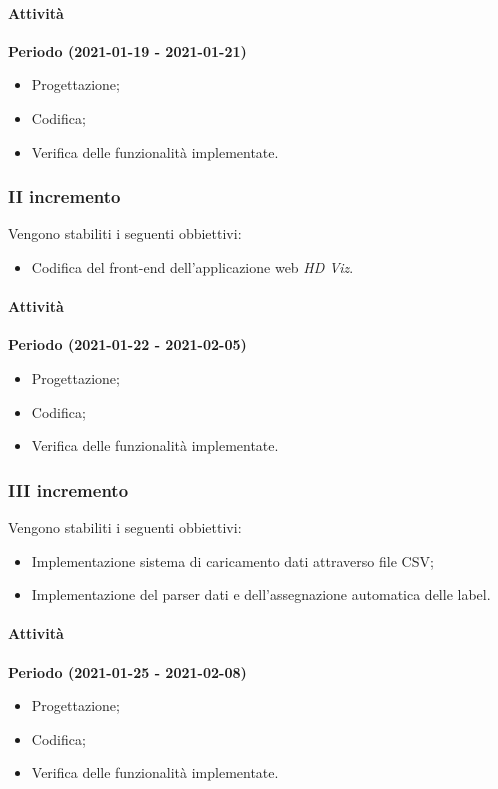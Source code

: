 \documentclass[../piano_di_progetto.tex]{subfiles}
\begin{document}
\paragraph{Attività}
\noindent\textbf{Periodo (2021-01-19 - 2021-01-21)}
\begin{itemize}
    \item Progettazione;
    \item Codifica;
    \item Verifica delle funzionalità implementate.
\end{itemize}

\subsubsection{II incremento}
Vengono stabiliti i seguenti obbiettivi:
\begin{itemize}
    \item Codifica del front-end dell'applicazione web \emph{HD Viz}.
\end{itemize}
\paragraph{Attività}
\noindent\textbf{Periodo (2021-01-22 - 2021-02-05)}
\begin{itemize}
    \item Progettazione;
    \item Codifica;
    \item Verifica delle funzionalità implementate.
\end{itemize}

\subsubsection{III incremento}
Vengono stabiliti i seguenti obbiettivi:
\begin{itemize}
    \item Implementazione sistema di caricamento dati attraverso file CSV;
    \item Implementazione del parser dati e dell'assegnazione automatica delle label.
\end{itemize}
\paragraph{Attività}
\noindent\textbf{Periodo (2021-01-25 - 2021-02-08)}
\begin{itemize}
    \item Progettazione;
    \item Codifica;
    \item Verifica delle funzionalità implementate.
\end{itemize}
\end{document}
